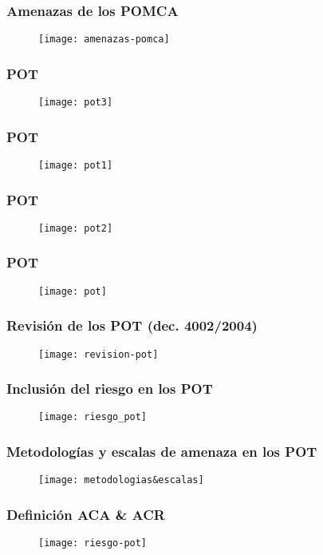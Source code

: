 \documentclass[12pt]{beamer}
\begin{document}
\begin{frame}
\frametitle{Amenazas de los POMCA}
\begin{figure}
\centering
\texttt{[image: amenazas-pomca]}
\end{figure}
\end{frame}
\begin{frame}
\frametitle{POT}
\begin{figure}
\centering
\texttt{[image: pot3]}
\end{figure}
\end{frame}
\begin{frame}
\frametitle{POT}
\begin{figure}
\centering
\texttt{[image: pot1]}
\end{figure}
\end{frame}
\begin{frame}
\frametitle{POT}
\begin{figure}
\centering
\texttt{[image: pot2]}
\end{figure}
\end{frame}
\begin{frame}
\frametitle{POT}
\begin{figure}
\centering
\texttt{[image: pot]}
\end{figure}
\end{frame}
\begin{frame}
\frametitle{Revisión de los POT (dec. 4002/2004)}
\begin{figure}
\centering
\texttt{[image: revision-pot]}
\end{figure}
\end{frame}
\begin{frame}
\frametitle{Inclusión del riesgo en los POT}
\begin{figure}
\centering
\texttt{[image: riesgo\_pot]}
\end{figure}
\end{frame}
\begin{frame}
\frametitle{Metodologías y escalas de amenaza en los POT}
\begin{figure}
\centering
\texttt{[image: metodologias\&escalas]}
\end{figure}
\end{frame}
\begin{frame}
\frametitle{Definición ACA \& ACR}
\begin{figure}
\centering
\texttt{[image: riesgo-pot]}
\end{figure}
\end{frame}
\end{document}
